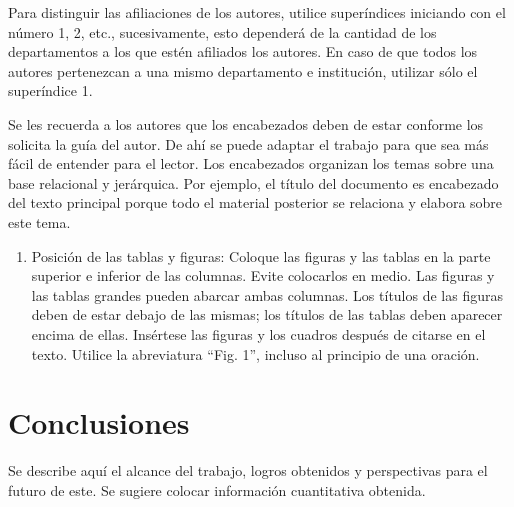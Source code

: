     
    Para distinguir las afiliaciones de los autores, utilice superíndices iniciando con el número 1, 2, etc., sucesivamente, esto dependerá de la cantidad de los departamentos a los que estén afiliados los autores. En caso de que todos los autores pertenezcan a una mismo departamento e institución, utilizar sólo el superíndice 1. 
    
    
    Se les recuerda a los autores que los encabezados deben de estar conforme los solicita la guía del autor. De ahí se puede adaptar el trabajo para que sea más fácil de entender para el lector.
    Los encabezados organizan los temas sobre una base relacional y jerárquica. Por ejemplo, el título del documento es encabezado del texto principal porque todo el material posterior se relaciona y elabora sobre este tema. 
    
    
    \begin{enumerate}
        \item Posición de las tablas y figuras: Coloque las figuras y las tablas en la parte superior e inferior de las columnas. Evite colocarlos en medio. Las figuras y las tablas grandes pueden abarcar ambas columnas. Los títulos de las figuras deben de estar debajo de las mismas; los títulos de las tablas deben aparecer encima de ellas. Insértese las figuras y los cuadros después de citarse en el texto. Utilice la abreviatura “Fig. 1”, incluso al principio de una oración. 
    \end{enumerate}
    
    \section{Conclusiones}
    
    Se describe aquí el alcance del trabajo, logros obtenidos y perspectivas para el futuro de este. Se sugiere colocar información cuantitativa obtenida.
    
